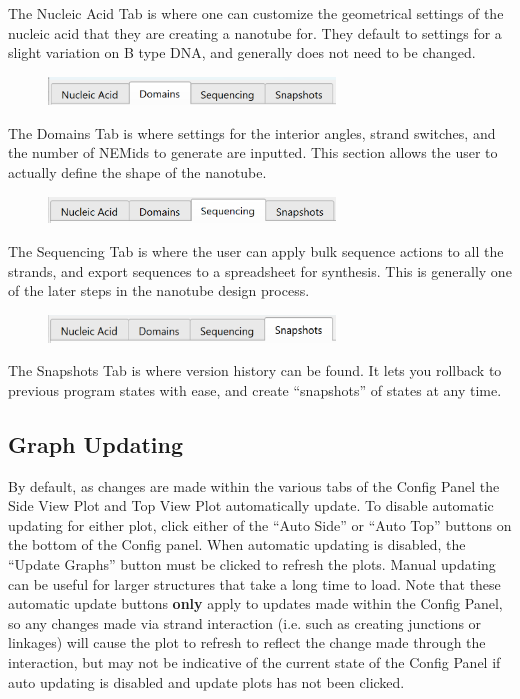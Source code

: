 \documentclass[titlepage]{article}
\begin{document}
The Nucleic Acid Tab is where one can customize the geometrical settings of the nucleic acid that they are creating a nanotube for. They default to settings for a slight variation on B type DNA, and generally does not need to be changed. 

\begin{figure}[h]
	\centering
	\includegraphics[width=3in]{"domains-tab-activated.png"}
	\label{fig:domains-tab-activated}
\end{figure}

The Domains Tab is where settings for the interior angles, strand switches, and the number of NEMids to generate are inputted. This section allows the user to actually define the shape of the nanotube.

\begin{figure}[h]
	\centering
	\includegraphics[width=3in]{"sequencing-tab-activated.png"}
	\label{fig:sequencing-activated}
\end{figure}

The Sequencing Tab is where the user can apply bulk sequence actions to all the strands, and export sequences to a spreadsheet for synthesis. This is generally one of the later steps in the nanotube design process.

\begin{figure}[h]
	\centering
	\includegraphics[width=3in]{"snapshots-tab-activated.png"}
	\label{fig:snapshots-activated}
\end{figure}

The Snapshots Tab is where version history can be found. It lets you rollback to previous program states with ease, and create ``snapshots'' of states at any time.

\subsection{Graph Updating}

By default, as changes are made within the various tabs of the Config Panel the Side View Plot and Top View Plot automatically update. To disable automatic updating for either plot, click either of the ``Auto Side'' or ``Auto Top'' buttons on the bottom of the Config panel. When automatic updating is disabled, the ``Update Graphs'' button must be clicked to refresh the plots. Manual updating can be useful for larger structures that take a long time to load. Note that these automatic update buttons \textbf{only} apply to updates made within the Config Panel, so any changes made via strand interaction (i.e. such as creating junctions or linkages) will cause the plot to refresh to reflect the change made through the interaction, but may not be indicative of the current state of the Config Panel if auto updating is disabled and update plots has not been clicked.
\end{document}
